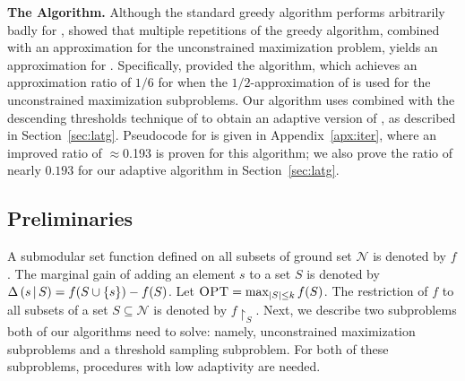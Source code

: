 \textbf{The \iter Algorithm.}
Although the standard greedy algorithm performs arbitrarily
badly for \sm,
 showed that multiple repetitions of the
greedy algorithm, combined with an approximation for
the unconstrained maximization problem, yields an approximation
for \sm. %
Specifically,  provided
the \iter algorithm, which
achieves an approximation ratio of $1/6$
for \sm when
the $1/2$-approximation of  is used
for the unconstrained maximization subproblems.
Our algorithm \algTwofullname uses \threseq combined with
the descending thresholds technique of  to
obtain an adaptive version
of \iter, as described
in Section~\ref{sec:latg}. Pseudocode for \iter is given in Appendix~\ref{apx:iter},
where an improved ratio of $\approx$0.193 is proven for this algorithm; we
also prove the ratio of nearly $0.193$ 
for our adaptive algorithm \latg in Section~\ref{sec:latg}.


\subsection{Preliminaries} \label{sec:prelim} 
A submodular set function defined on all subsets of ground set 
$\mathcal N$ is denoted by $f$. 
The marginal gain of adding an element $s$ to a set 
$S$ is denoted by $\Delta \left( s \, | \, S \right) = f( S \cup \{ s \} ) - f(S)$. 
Let $\textsc{OPT} = \max_{|S|\le k}f(S)$.
The restriction
of $f$ to all subsets of a set $S \subseteq \mathcal N$ is denoted by
$f \restriction_{S}$. 
Next, we describe two subproblems both
of our algorithms need to solve: namely, 
unconstrained maximization subproblems and
a threshold sampling subproblem.
For both of these subproblems, procedures with low adaptivity are needed.

